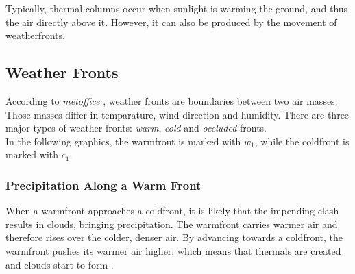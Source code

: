 \noindent
Typically, \gls{thermal} columns occur when sunlight is warming the ground, and thus the air directly above it. 
However, it can also be produced by the movement of \gls{weatherfront}s.

\clearpage

\subsection{Weather Fronts}
According to \emph{metoffice} \cite{metoffice:weatherfronts}, weather fronts are boundaries between two air masses. Those masses differ in temparature, wind direction and humidity.
There are three major types of weather fronts: \emph{warm}, \emph{cold} and \emph{occluded} fronts.
\\
In the following graphics, the \gls{warmfront} is marked with \color{red}$w_1$\color{black}, while the \gls{coldfront} is marked with \color{cyan}$c_1$\color{black}.

\subsubsection{Precipitation Along a Warm Front}
When a \gls{warmfront} approaches a \gls{coldfront}, it is likely that the impending clash results in clouds, bringing \gls{precipitation}.
The \gls{warmfront} carries warmer air and therefore rises over the colder, denser air.
By advancing towards a \gls{coldfront}, the \gls{warmfront} pushes its warmer air higher,
which means that \gls{thermal}s are created and clouds start to form \cite{ww2010:warmfront}.

